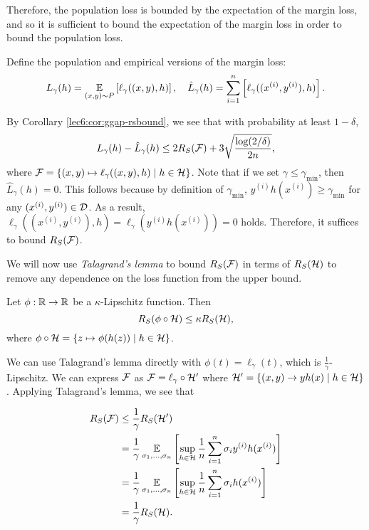 Therefore, the population loss is bounded by the expectation of the margin loss, and so it is sufficient to bound the expectation of the margin loss in order to bound the population loss.

Define the population and empirical versions of the margin loss:
\begin{equation}
L_\gamma(h) = \operatorname*{\mathbb{E}}_{(x,y)\sim P}\left[ \ell_\gamma((x,y), h)\right], \quad \hat{L}_\gamma(h) = \sum_{i=1}^n\left [\ell_\gamma((x^{(i)},y^{(i)}), h)\right].
\end{equation}

By Corollary \ref{lec6:cor:ggap-rsbound}, we see that with probability at least $1-\delta$,
\begin{equation}
L_\gamma(h) - \hat{L}_\gamma(h)\leq 2R_S(\mathcal F) + 3\sqrt{\frac{\log (2/\delta)}{2n}},
\end{equation}
where $\mathcal F = \{(x,y)\mapsto \ell_\gamma((x,y), h)\mid h\in\mathcal H\}$. Note that if we set $\gamma\leq \gamma_{\min}$, then $\hat{L}_{\gamma}(h) = 0$. This follows because by definition of $\gamma_{\min}$, $y^{(i)}h(x^{(i)})\geq \gamma_{\min}$ for any $(x^{(i)}, y^{(i)})\in \mathcal D$. As a result, $\ell_\gamma((x^{(i)}, y^{(i)}), h) = \ell_\gamma(y^{(i)}h(x^{(i)})) = 0$ holds. Therefore, it suffices to bound $R_S(\mathcal F)$.

We will now use \textit{Talagrand's lemma} to bound $R_S(\mathcal F)$ in terms of $R_S(\mathcal H)$ to remove any dependence on the loss function from the upper bound. 
 
\begin{lemma} \label{lec6:lem:talagrand_lemma}
Let $\phi:\mathbb R\to\mathbb R$ be a $\kappa$-Lipschitz function. Then \begin{equation}
    R_S(\phi\circ \mathcal H)\leq \kappa R_S(\mathcal H),
\end{equation} 
where $\phi\circ\mathcal H = \{z\mapsto \phi(h(z))\mid h\in\mathcal H\}$.
\end{lemma}

We can use Talagrand's lemma directly with $\phi(t) = \ell_\gamma(t)$, which is $\frac{1}{\gamma}$-Lipschitz. We can express $\mathcal F$ as $\mathcal F=\ell_\gamma\circ\mathcal H'$ where $\mathcal H' = \{(x,y)\to yh(x)\mid h\in\mathcal H\}$. Applying Talagrand's lemma, we see that

\begin{align}
R_S(\mathcal F) &\leq \frac{1}{\gamma}R_S(\mathcal H') \\
&= \frac{1}{\gamma}\operatorname*{\mathbb{E}}_{\sigma_1,\dots, \sigma_n} \left[ \sup_{h\in \mathcal H} \frac{1}{n} \sum^n_{i=1} \sigma_i y^{(i)}h(x^{(i)}) \right] \\
&= \frac{1}{\gamma}\operatorname*{\mathbb{E}}_{\sigma_1,\dots, \sigma_n} \left[ \sup_{h\in \mathcal H} \frac{1}{n} \sum^n_{i=1} \sigma_i h(x^{(i)})  \right] \\
&= \frac{1}{\gamma}R_S(\mathcal H).
\end{align}

